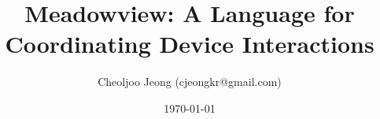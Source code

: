 \documentclass{pamsbook}
\begin{document}

\title{{\Large\bf{}Meadowview:  A Language for Coordinating Device
    Interactions}} 
\author{\normalsize Cheoljoo Jeong (cjeongkr@gmail.com)}
\date{\normalsize\today}
\maketitle




\end{document}
